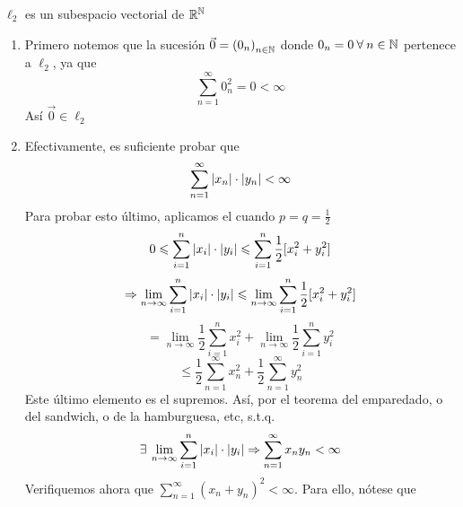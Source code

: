\begin{aff}
    ${\ell}_{2}$ es un subespacio vectorial de $\mathbb{R}^{\mathbb{N}}$
\end{aff}
\begin{proofexplanation}
\begin{enumerate}[label={\roman*})]
    \item Primero notemos que la sucesión $\vec{0} = {({0}_{n})}_{n \in \mathbb{N}}$ donde ${0}_{n} = 0 \: \forall \: n \in \mathbb{N}$ pertenece a ${\ell}_{2}$, ya que
    \begin{equation*}
        \sum\limits_{n=1}^{\infty} {0}_{n}^{2} = 0 < \infty
    \end{equation*}
    Así $\vec{0} \in {\ell}_{2}$
    \item Efectivamente, es suficiente probar que
    \begin{equation*}
        \sum\limits_{n=1}^{\infty} \abs{{x}_{n}} \cdot \abs{{y}_{n}} < \infty 
    \end{equation*}
    Para probar esto último, aplicamos el  cuando $p=q= \frac{1}{2}$
    \begin{equation*}
        0 \leqslant \sum\limits_{i=1}^{n} \abs{{x}_{i}} \cdot \abs{{y}_{i}} \leqslant \sum\limits_{i=1}^{n} \frac{1}{2} [{x}_{i}^{2}+{y}_{i}^{2}]
    \end{equation*}
    \begin{equation*}
        \Rightarrow \lim\limits_{n\to\infty}  \sum\limits_{i=1}^{n} \abs{{x}_{i}} \cdot \abs{{y}_{i}} \leqslant  \lim\limits_{n\to\infty} \sum\limits_{i=1}^{n} \frac{1}{2} [{x}_{i}^{2}+{y}_{i}^{2}]
    \end{equation*}
    \begin{equation*}
        = \lim\limits_{n\to\infty} \frac{1}{2} \sum\limits_{i=1}^{n} {x}_{i}^{2} + \lim\limits_{n\to\infty} \frac{1}{2} \sum\limits_{i=1}^{n} {y}_{i}^{2}
    \end{equation*}
    \begin{equation*}
        \leqslant  \frac{1}{2} \sum\limits_{n=1}^{\infty} {x}_{n}^{2} + \frac{1}{2} \sum\limits_{n=1}^{\infty} {y}_{n}^{2}
    \end{equation*}
    Este último elemento es el supremos. Así, por el teorema del emparedado, o del sandwich, o de la hamburguesa, etc, s.t.q.
    \begin{equation*}
        \exists \: \lim\limits_{n\to\infty} \sum\limits_{i=1}^{n} \abs{{x}_{i}} \cdot \abs{{y}_{i}} \Rightarrow \sum\limits_{n=1}^{\infty} {x}_{n}{y}_{n} < \infty
    \end{equation*}
    Verifiquemos ahora que $\sum\limits_{n=1}^{\infty} {({x}_{n}+{y}_{n})}^{2} < \infty$. Para ello, nótese que

\end{enumerate}
\end{proofexplanation}
